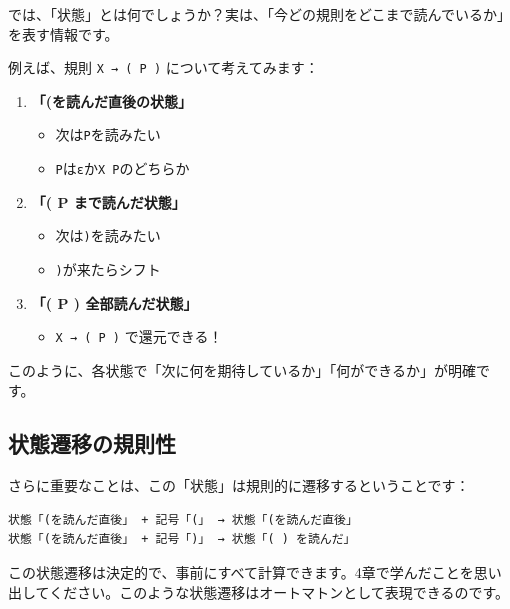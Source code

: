 では、「状態」とは何でしょうか？実は、「今どの規則をどこまで読んでいるか」を表す情報です。

例えば、規則 \texttt{X\ →\ (\ P\ )} について考えてみます：

\begin{enumerate}
\def\labelenumi{\arabic{enumi}.}
\item
  \textbf{「(を読んだ直後の状態」}

  \begin{itemize}
  \tightlist
  \item
    次は\texttt{P}を読みたい
  \item
    \texttt{P}は\texttt{ε}か\texttt{X\ P}のどちらか
  \end{itemize}
\item
  \textbf{「( P まで読んだ状態」}

  \begin{itemize}
  \tightlist
  \item
    次は\texttt{)}を読みたい
  \item
    \texttt{)}が来たらシフト
  \end{itemize}
\item
  \textbf{「( P ) 全部読んだ状態」}

  \begin{itemize}
  \tightlist
  \item
    \texttt{X\ →\ (\ P\ )} で還元できる！
  \end{itemize}
\end{enumerate}

このように、各状態で「次に何を期待しているか」「何ができるか」が明確です。

\hypertarget{chapter5-ux72b6ux614bux9077ux79fbux306eux898fux5247ux6027}{%
\subsection{状態遷移の規則性}\label{chapter5-ux72b6ux614bux9077ux79fbux306eux898fux5247ux6027}}

さらに重要なことは、この「状態」は規則的に遷移するということです：

\begin{verbatim}
状態「(を読んだ直後」 + 記号「(」 → 状態「(を読んだ直後」
状態「(を読んだ直後」 + 記号「)」 → 状態「( ) を読んだ」
\end{verbatim}

この状態遷移は決定的で、事前にすべて計算できます。4章で学んだことを思い出してください。このような状態遷移はオートマトンとして表現できるのです。

